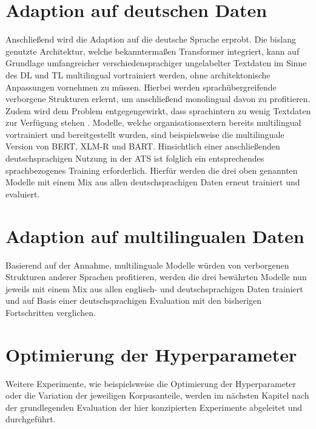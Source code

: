 \section{Adaption auf deutschen Daten}
\noindent
Anschließend wird die Adaption auf die deutsche Sprache erprobt. Die bislang genutzte Architektur, welche bekanntermaßen Transformer integriert, kann auf Grundlage umfangreicher verschiedensprachiger ungelabelter Textdaten im Sinne des \ac{DL} und \ac{TL} multilingual vortrainiert werden, ohne architektonische Anpassungen vornehmen zu müssen. Hierbei werden sprachübergreifende verborgene Strukturen erlernt, um anschließend monolingual davon zu profitieren. Zudem wird dem Problem entgegengewirkt, dass sprachintern zu wenig Textdaten zur Verfügung stehen \cite{MOB20}. Modelle, welche organisationsextern bereits multilingual vortrainiert und bereitgestellt wurden, sind beispielsweise die multilinguale Version von \ac{BERT}, \ac{XLM-R} und \ac{BART}. Hinsichtlich einer anschließenden deutschsprachigen Nutzung in der \ac{ATS} ist folglich ein entsprechendes sprachbezogenes Training erforderlich. Hierfür werden die drei oben genannten Modelle mit einem Mix aus allen deutschsprachigen Daten erneut trainiert und evaluiert.


\section{Adaption auf multilingualen Daten}
\noindent
Basierend auf der Annahme, multilinguale Modelle würden von verborgenen Strukturen anderer Sprachen profitieren, werden die drei bewährten Modelle nun jeweils mit einem Mix aus allen englisch- und deutschsprachigen Daten trainiert und auf Basis einer deutschsprachigen Evaluation mit den bisherigen Fortschritten verglichen.


\section{Optimierung der Hyperparameter}
\noindent
Weitere Experimente, wie beispielsweise die Optimierung der Hyperparameter oder die Variation der jeweiligen Korpusanteile, werden im nächsten Kapitel nach der grundlegenden Evaluation der hier konzipierten Experimente abgeleitet und durchgeführt.

